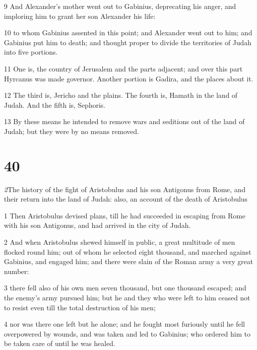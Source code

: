 \par 9 And Alexander’s mother went out to Gabinius, deprecating his anger, and imploring him to grant her son Alexander his life: 

\par 10 to whom Gabinius assented in this point; and Alexander went out to him; and Gabinius put him to death; and thought proper to divide the territories of Judah into five portions. 

\par 11 One is, the country of Jerusalem and the parts adjacent; and over this part Hyrcanus was made governor. Another portion is Gadira, and the places about it. 

\par 12 The third is, Jericho and the plains. The fourth is, Hamath in the land of Judah. And the fifth is, Sephoris. 

\par 13 By these means he intended to remove wars and seditions out of the land of Judah; but they were by no means removed. 

\chapter{40}

\par \textit2{The history of the fight of Aristobulus and his son Antigonus from Rome, and their return into the land of Judah: also, an account of the death of Aristobulus}

\par 1 Then Aristobulus devised plans, till he had succeeded in escaping from Rome with his son Antigonus, and had arrived in the city of Judah. 

\par 2 And when Aristobulus shewed himself in public, a great multitude of men flocked round him; out of whom he selected eight thousand, and marched against Gabinius, and engaged him; and there were slain of the Roman army a very great number: 

\par 3 there fell also of his own men seven thousand, but one thousand escaped; and the enemy’s army pursued him; but he and they who were left to him ceased not to resist even till the total destruction of his men; 

\par 4 nor was there one left but he alone; and he fought most furiously until he fell overpowered by wounds, and was taken and led to Gabinius; who ordered him to be taken care of until he was healed. 

